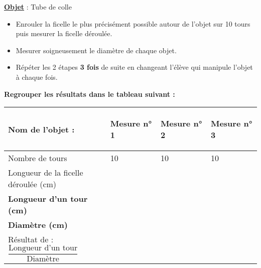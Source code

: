 \documentclass[a4paper,11pt]{article}
\newcommand{\bi}{\begin{itemize}}
\newcommand{\ei}{\end{itemize}}
\begin{document}
{\large \textbf{\underline{Objet}} : Tube de colle }\\

\bi

\item Enrouler la ficelle le plus précisément possible autour de l'objet sur 10 tours puis mesurer la ficelle déroulée.\\


\item Mesurer soigneusement le diamètre de chaque objet.\\

\item Répéter les 2 étapes \textbf{3 fois} de suite en changeant l'élève  qui manipule l'objet à chaque fois.\\


\ei

\textbf{Regrouper les résultats dans le tableau suivant : }

\renewcommand{\arraystretch}{2.2}

\begin{flushleft}
\begin{tabular}{|m{7cm}|m{3.5cm}|m{3.5cm}|m{3.5cm}|}
\hline 
\begin{center}
 \textbf{Nom de l'objet :}
 \end{center} & \begin{center}
\textbf{ Mesure n° 1}
 \end{center}  & \begin{center}
\textbf{ Mesure n° 2}
 \end{center} &  \begin{center}
\textbf{Mesure n° 3}
 \end{center}   \\ 
\hline 
Nombre de tours& 10 & 10 &  10   \\ 
\hline 
Longueur de la ficelle déroulée (cm) &  &   &    \\ 
\hline 
\textbf{Longueur d'un tour (cm)}&  &  &    \\ 
\hline 
\textbf{Diamètre (cm)} &  &  &     \\ 
\hline
Résultat de : \hspace*{0.75cm}$\dfrac{\text{Longueur d'un tour}}{\text{Diamètre}}$ &  &  &     \\ 
\hline
\end{tabular} 
\end{flushleft}
\vspace*{0.5cm}


\newpage
\end{document}
